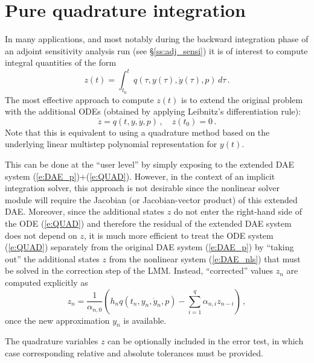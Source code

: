 \section{Pure quadrature integration}\label{s:quad}

In many applications, and most notably during the backward integration phase
of an adjoint sensitivity analysis run (see \S\ref{ss:adj_sensi}) it is of
interest to compute integral quantities of the form
\begin{equation}\label{e:QUAD}
  z(t) = \int_{t_0}^t q(\tau, y(\tau), \dot{y}(\tau), p) \, d\tau \, .
\end{equation}
The most effective approach to compute $z(t)$ is to extend the original problem
with the additional ODEs (obtained by applying Leibnitz's differentiation rule):
\begin{equation}
  \dot z = q(t,y,\dot{y},p) \, , \quad z(t_0) = 0 \, .
\end{equation}
Note that this is equivalent to using a quadrature method based on the underlying
linear multistep polynomial representation for $y(t)$.

This can be done at the ``user level'' by simply exposing to {\idas} the extended 
DAE system (\ref{e:DAE_p})+(\ref{e:QUAD}). However, in the context of an implicit 
integration solver, this approach is not desirable since the nonlinear solver 
module will require the Jacobian (or Jacobian-vector product) of this extended DAE.
Moreover, since the additional states $z$ do not enter the right-hand side of
the ODE (\ref{e:QUAD}) and therefore the residual of the extended DAE system
does not depend on $z$, it is much more efficient to treat the ODE system (\ref{e:QUAD})
separately from the original DAE system (\ref{e:DAE_p}) by ``taking out'' the additional
states $z$ from the nonlinear system (\ref{e:DAE_nls}) that must be solved in
the correction step of the LMM. Instead, ``corrected'' values $z_n$ are computed
explicitly as
\begin{equation*}
  z_n = \frac{1}{\alpha_{n,0}} \left(
    h_n q(t_n, y_n, \dot{y}_n, p) - \sum_{i=1}^q \alpha_{n,i} z_{n-i}
    \right) \, ,
\end{equation*}
once the new approximation $y_n$ is available.

The quadrature variables $z$ can be optionally included in the error test, in 
which case corresponding relative and absolute tolerances must be provided.


